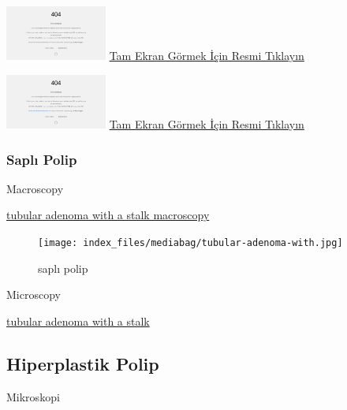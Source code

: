 \documentclass[
  letterpaper,
  DIV=11,
  numbers=noendperiod]{scrreprt}
\begin{document}
\href{https://images.patolojiatlasi.com/tubularadenoma-flat/HE.html}{\includegraphics[width=0.25\textwidth,height=\textheight]{./screenshots/tubularadenoma-flat1_screenshot.png}}
\href{https://images.patolojiatlasi.com/tubularadenoma-flat/HE.html}{Tam
Ekran Görmek İçin Resmi Tıklayın}

\href{https://images.patolojiatlasi.com/tubularadenoma-flat/HE2.html}{\includegraphics[width=0.25\textwidth,height=\textheight]{./screenshots/tubularadenoma-flat2_screenshot.png}}
\href{https://images.patolojiatlasi.com/tubularadenoma-flat/HE2.html}{Tam
Ekran Görmek İçin Resmi Tıklayın}

\hypertarget{sec-kolon-sapli-polip}{%
\subsubsection{Saplı Polip}\label{sec-kolon-sapli-polip}}

Macroscopy

\href{https://images.patolojiatlasi.com/tubularadenoma/tubular-adenoma-with-stalk-macroscopy.jpg}{tubular
adenoma with a stalk macroscopy}

\begin{figure}

{\centering \texttt{[image: index\_files/mediabag/tubular-adenoma-with.jpg]}

}

\caption{saplı polip}

\end{figure}

Microscopy

\href{https://images.patolojiatlasi.com/tubularadenoma/tubular-adenoma-with-stalk.jpeg}{tubular
adenoma with a stalk}

\hypertarget{sec-kolon-hiperplastik-polip}{%
\subsection{Hiperplastik Polip}\label{sec-kolon-hiperplastik-polip}}

Mikroskopi
\end{document}
